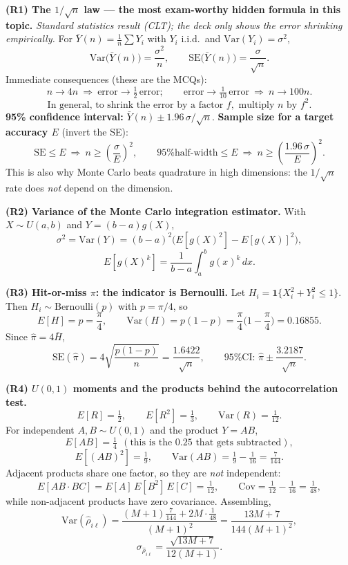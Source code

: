 \begin{derivedbox}
\textbf{(R1) The $1/\sqrt{n}$ law --- the most exam-worthy hidden formula in this topic.} \emph{Standard statistics result (CLT); the deck only shows the error shrinking empirically.} For $\bar Y(n)=\frac1n\sum Y_i$ with $Y_i$ i.i.d.\ and $\mathrm{Var}(Y_i)=\sigma^2$,
\[
\mathrm{Var}\big(\bar Y(n)\big)=\frac{\sigma^2}{n}, \qquad \mathrm{SE}\big(\bar Y(n)\big)=\frac{\sigma}{\sqrt n}.
\]
Immediate consequences (these are the MCQs):
\[
n \to 4n \ \Rightarrow\ \text{error} \to \tfrac12\,\text{error}; \qquad
\text{error}\to\tfrac{1}{10}\,\text{error} \ \Rightarrow\ n \to 100n.
\]
\[
\text{In general, to shrink the error by a factor } f, \text{ multiply } n \text{ by } f^2 .
\]
\textbf{95\% confidence interval:} $\bar Y(n) \pm 1.96\,\sigma/\sqrt n$.
\textbf{Sample size for a target accuracy $E$} (invert the SE):
\[
\mathrm{SE}\le E \ \Rightarrow\ n \ge \left(\frac{\sigma}{E}\right)^2, \qquad
\text{95\% half-width} \le E \ \Rightarrow\ n \ge \left(\frac{1.96\,\sigma}{E}\right)^2 .
\]
This is also why Monte Carlo beats quadrature in high dimensions: the $1/\sqrt n$ rate does \emph{not} depend on the dimension.

\smallskip
\textbf{(R2) Variance of the Monte Carlo integration estimator.} With $X\sim U(a,b)$ and $Y=(b-a)g(X)$,
\[
\sigma^2 = \mathrm{Var}(Y) = (b-a)^2\Big( E[g(X)^2] - E[g(X)]^2 \Big),
\]
\[
E[g(X)^k] = \frac{1}{b-a}\int_a^b g(x)^k\,dx .
\]

\smallskip
\textbf{(R3) Hit-or-miss $\pi$: the indicator is Bernoulli.} Let $H_i = \mathbf 1\{X_i^2+Y_i^2\le1\}$. Then $H_i\sim\mathrm{Bernoulli}(p)$ with $p=\pi/4$, so
\[
E[H]=p=\frac{\pi}{4}, \qquad \mathrm{Var}(H)=p(1-p)=\frac{\pi}{4}\Big(1-\frac{\pi}{4}\Big)=0.16855 .
\]
Since $\hat\pi = 4\bar H$,
\[
\mathrm{SE}(\hat\pi) = 4\sqrt{\frac{p(1-p)}{n}} = \frac{1.6422}{\sqrt n},
\qquad \text{95\% CI: } \hat\pi \pm \frac{3.2187}{\sqrt n}.
\]

\smallskip
\textbf{(R4) $U(0,1)$ moments and the products behind the autocorrelation test.}
\[
E[R]=\tfrac12,\qquad E[R^2]=\tfrac13,\qquad \mathrm{Var}(R)=\tfrac1{12}.
\]
For independent $A,B\sim U(0,1)$ and the product $Y=AB$,
\[
E[AB]=\tfrac14 \ \ (\text{this is the } 0.25 \text{ that gets subtracted}),
\]
\[
E[(AB)^2]=\tfrac19, \qquad \mathrm{Var}(AB)=\tfrac19-\tfrac1{16}=\tfrac{7}{144}.
\]
Adjacent products share one factor, so they are \emph{not} independent:
\[
E[AB\cdot BC] = E[A]\,E[B^2]\,E[C] = \tfrac1{12}, \qquad
\mathrm{Cov} = \tfrac1{12}-\tfrac1{16} = \tfrac1{48},
\]
while non-adjacent products have zero covariance. Assembling,
\[
\mathrm{Var}(\hat\rho_{i\ell}) = \frac{(M{+}1)\tfrac{7}{144} + 2M\cdot\tfrac1{48}}{(M+1)^2}
= \frac{13M+7}{144(M+1)^2},
\]
\[
\sigma_{\hat\rho_{i\ell}} = \frac{\sqrt{13M+7}}{12(M+1)} .
\]


\end{derivedbox}

